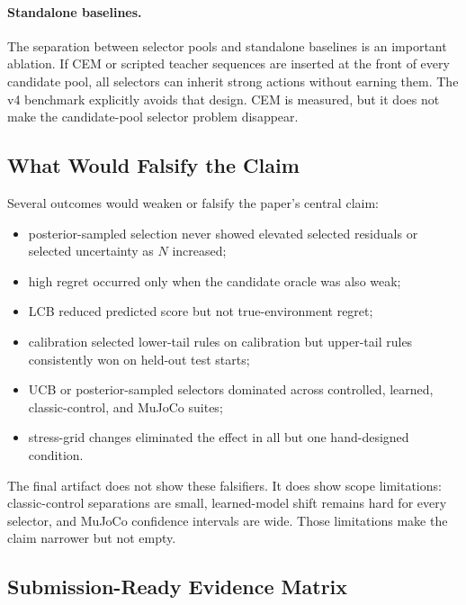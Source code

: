 \documentclass{article}
\begin{document}
\paragraph{Standalone baselines.}
The separation between selector pools and standalone baselines is an important
ablation. If CEM or scripted teacher sequences are inserted at the front of
every candidate pool, all selectors can inherit strong actions without earning
them. The v4 benchmark explicitly avoids that design. CEM is measured, but it
does not make the candidate-pool selector problem disappear.

\subsection{What Would Falsify the Claim}

Several outcomes would weaken or falsify the paper's central claim:
\begin{itemize}
    \item posterior-sampled selection never showed elevated selected residuals
    or selected uncertainty as $N$ increased;
    \item high regret occurred only when the candidate oracle was also weak;
    \item LCB reduced predicted score but not true-environment regret;
    \item calibration selected lower-tail rules on calibration but upper-tail
    rules consistently won on held-out test starts;
    \item UCB or posterior-sampled selectors dominated across controlled,
    learned, classic-control, and MuJoCo suites;
    \item stress-grid changes eliminated the effect in all but one
    hand-designed condition.
\end{itemize}

The final artifact does not show these falsifiers. It does show scope
limitations: classic-control separations are small, learned-model shift remains
hard for every selector, and MuJoCo confidence intervals are wide. Those
limitations make the claim narrower but not empty.

\subsection{Submission-Ready Evidence Matrix}
\end{document}
